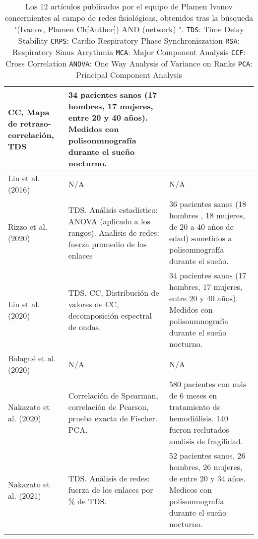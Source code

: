 \documentclass[twoside,twocolumn]{article}
\begin{document}
\begin{center}
\begin{longtable}{|p{}p{}p{}|}
    CC,
    Mapa de retraso-correlación, TDS
    &
    34 pacientes sanos (17 hombres, 17 mujeres, entre 20 y 40 años). Medidos con polisonmnografía durante el sueño nocturno.
    \\ \hline
    Lin et al. (2016)\cite{ivanov2016focus} &
    N/A
    &
    N/A
    \\ \hline
    Rizzo et al. (2020)\cite{rizzo2020network} &
    TDS.
    Análisis estadístico: ANOVA (aplicado a los rangos).
    Analisis de redes: fuerza promedio de los enlaces
    &
    36 pacientes sanos (18 hombres , 18 mujeres, de 20 a 40 años de edad) sometidos a polisomnografía durante el sueño.
    \\ \hline
    Lin et al. (2020)\cite{lin2020dynamic} &
    TDS, CC, Distribución de valores de CC, decomposición espectral de ondas.
    &
    34 pacientes sanos (17 hombres, 17 mujeres, entre 20 y 40 años). Medidos con polisonmnografía durante el sueño nocturno.
    \\ \hline
    Balagué et al. (2020)\cite{balague2020network} &
    N/A
    &
    N/A
    \\ \hline
    Nakazato et al. (2020)\cite{nakazato2020estimation} &
    Correlación de Spearman, correlación de Pearson, prueba exacta de Fischer.
    PCA.
    &
    580 pacientes con más de 6 meses en tratamiento de hemodiálisis. 140 fueron reclutados analisis de fragilidad.
    \\ \hline
    Nakazato et al. (2021)\cite{ivanov2021signal} &
    TDS.
    Análisis de redes: fuerza de los enlaces por \% de TDS.
    &
    52 pacientes sanos, 26 hombres, 26 mujeres, de entre 20 y 34 años. Medicos con polisomnografía durante el sueño nocturno.
    \\ \hline
    \caption{Los 12 artículos publicados por el equipo de Plamen Ivanov concernientes al campo de redes fisiológicas, obtenidos tras la búsqueda "(Ivanov, Plamen Ch[Author]) AND (network) ".
    \texttt{TDS}: Time Delay Stability
    \texttt{CRPS}: Cardio Respiratory Phase Synchroniszation
    \texttt{RSA}: Respiratory Sinus Arrythmia
    \texttt{MCA}: Major Component Analysis
    \texttt{CCF}: Cross Correlation
    \texttt{ANOVA}: One Way Analysis of Variance on Ranks
    \texttt{PCA}: Principal Component Analysis
    }
    \label{tab:plamenGroup}
  \end{longtable}
\end{center}
\end{document}
